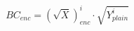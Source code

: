 \begin{equation}
    BC_{enc} = (\sqrt{X})_{enc}^i \cdot \sqrt{Y_{plain}^i}
    \label{eq:fhe_bc_enc}
\end{equation}